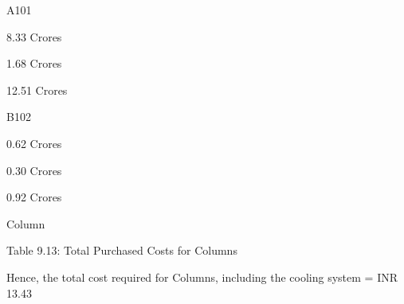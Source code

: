 \documentclass[a4paper,portrait,12pt]{article}
\begin{document}
\begin{flushleft}
A101
\end{flushleft}





\begin{flushleft}
8.33 Crores
\end{flushleft}





\begin{flushleft}
1.68 Crores
\end{flushleft}





\begin{flushleft}
12.51 Crores
\end{flushleft}





\begin{flushleft}
B102
\end{flushleft}





\begin{flushleft}
0.62 Crores
\end{flushleft}





\begin{flushleft}
0.30 Crores
\end{flushleft}





\begin{flushleft}
0.92 Crores
\end{flushleft}





\begin{flushleft}
Column
\end{flushleft}





\begin{flushleft}
Table 9.13: Total Purchased Costs for Columns
\end{flushleft}





\begin{flushleft}
Hence, the total cost required for Columns, including the cooling system = INR 13.43
\end{flushleft}
\end{document}
